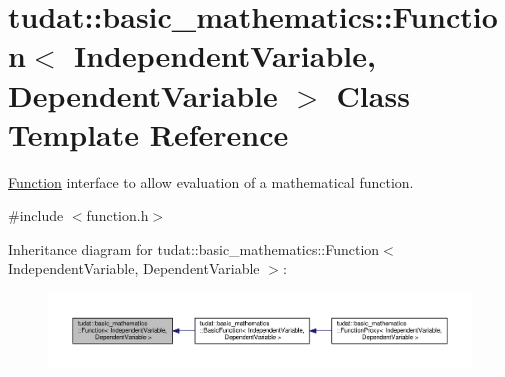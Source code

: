 \hypertarget{classtudat_1_1basic__mathematics_1_1Function}{}\section{tudat\+:\+:basic\+\_\+mathematics\+:\+:Function$<$ Independent\+Variable, Dependent\+Variable $>$ Class Template Reference}
\label{classtudat_1_1basic__mathematics_1_1Function}


\hyperlink{classtudat_1_1basic__mathematics_1_1Function}{Function} interface to allow evaluation of a mathematical function.  




{\ttfamily \#include $<$function.\+h$>$}



Inheritance diagram for tudat\+:\+:basic\+\_\+mathematics\+:\+:Function$<$ Independent\+Variable, Dependent\+Variable $>$\+:
\nopagebreak
\begin{figure}[H]
\begin{center}
\leavevmode
\includegraphics[width=350pt]{classtudat_1_1basic__mathematics_1_1Function__inherit__graph}
\end{center}
\end{figure}
